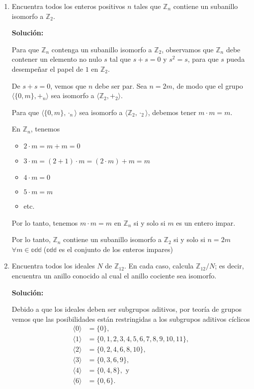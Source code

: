 \begin{enumerate}
\item Encuentra todos los enteros positivos $n$ tales que $\mathbb{Z}_{n}$ contiene un subanillo isomorfo a $\mathbb{Z}_2$. 

\textbf{Solución:}

Para que $\mathbb{Z}_n$ contenga un subanillo isomorfo a $\mathbb{Z}_2$, observamos que $\mathbb{Z}_n$ debe contener un elemento no nulo $s$ tal que $s + s = 0$ y $s^2 = s$, para que $s$ pueda desempeñar el papel de $1$ en $\mathbb{Z}_2$. 

De $s + s = 0$, vemos que $n$ debe ser par. Sea $n = 2m$, de modo que el grupo $\langle \{0, m\}, +_{n} \rangle$ sea isomorfo a $\langle \mathbb{Z}_2, +_{2} \rangle$. 

Para que $\langle \{0, m\}, \cdot_{n} \rangle$ sea isomorfo a $\langle \mathbb{Z}_2, \cdot_2 \rangle$, debemos tener $m \cdot m = m$. 

En $\mathbb{Z}_n$, tenemos 
\begin{itemize}
    \item $2 \cdot m = m + m = 0$
    \item $3 \cdot m = (2+1)\cdot m= (2 \cdot m) + m = m$
    \item $4 \cdot m = 0$
    \item $5 \cdot m = m$
    \item etc.
\end{itemize}

Por lo tanto, tenemos $m \cdot m = m$ en $\mathbb{Z}_n$ si y solo si $m$ es un entero impar. 

Por lo tanto, $\mathbb{Z}_n$ contiene un subanillo isomorfo a $\mathbb{Z}_2$ si y solo si $n = 2m$ $\forall m \in \mathbb{odd}$ ($\mathbb{odd}$ es el conjunto de los enteros impares)

\item Encuentra todos los ideales $N$ de $\mathbb{Z}_{12}$. En cada caso, calcula $\mathbb{Z}_{12} / N$; es decir, encuentra un anillo conocido al cual el anillo cociente sea isomorfo.

\textbf{Solución:}

Debido a que los ideales deben ser subgrupos aditivos, por teoría de grupos vemos que las posibilidades están restringidas a los subgrupos aditivos cíclicos
\begin{align*}
    \langle 0 \rangle &= \{0\}, \\
    \langle 1 \rangle &= \{0, 1, 2, 3, 4, 5, 6, 7, 8, 9, 10, 11\}, \\
    \langle 2 \rangle &= \{0, 2, 4, 6, 8, 10\}, \\
    \langle 3 \rangle &= \{0, 3, 6, 9\}, \\
    \langle 4 \rangle &= \{0, 4, 8\}, \text{ y } \\
    \langle 6 \rangle &= \{0, 6\}.
\end{align*}



\end{enumerate}
